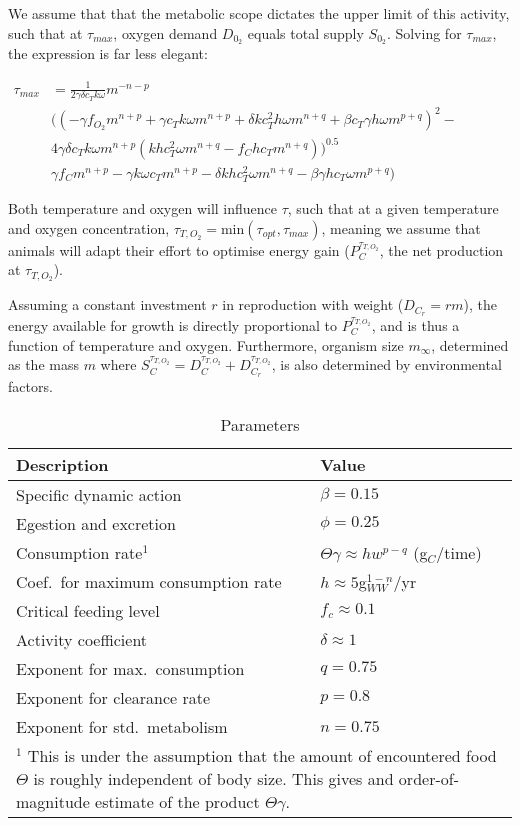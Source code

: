 \documentclass{article}
\begin{document}
We assume that that the metabolic scope dictates the upper limit of this activity, such that at $\tau_{max}$, oxygen demand $D_{0_2}$ equals total supply $S_{0_2}$. Solving for $\tau_{max}$, the expression is far less elegant:

\begin{math}
     \begin{aligned}
\tau_{max} &= \frac{1}{2 \gamma \delta c_T k \omega} m^{-n-p} \\
           &((-\gamma f_{O_2} m^{n+p}+\gamma c_T k \omega m^{n+p}+\delta k c_T^2 h \omega m^{n+q}+\beta c_T \gamma h \omega m^{p+q})^2 - \\ 
           &4 \gamma \delta c_T k \omega m^{n+p} (k h c_T^2 \omega m^{n+q}-f_C h c_T m^{n+q}))^{0.5} \\
          &\gamma f_C m^{n+p}-\gamma k \omega c_T m^{n+p}-\delta k h c_T^2 \omega m^{n+q}-\beta \gamma h c_T \omega m^{p+q})
          \end{aligned}
\end{math}

Both temperature and oxygen will influence $\tau$, such that at a given temperature and oxygen concentration, $\tau_{T,O_2} = \text{min}\left( \tau_{opt},\tau_{max} \right)$, meaning we assume that animals will adapt their effort to optimise energy gain ($P_C^{\tau_{T,O_2}}$, the net production at $\tau_{T,O_2}$).

Assuming a constant investment $r$ in reproduction with weight ($D_{C_r}=rm$), the energy available for growth is directly proportional to $P_C^{\tau_{T,O_2}}$, and is thus a function of temperature and oxygen. Furthermore, organism size $m_{\infty}$, determined as the mass $m$ where $S_C^{\tau_{T,O_2}} = D_C^{\tau_{T,O_2}} + D_{C_r}^{\tau_{T,O_2}}$, is also determined by environmental factors.


\begin{table}
\caption{Parameters}
\begin{tabular}{ll}
Description & Value \\
\hline
Specific dynamic action & $\beta = 0.15$ \\
Egestion and excretion & $\phi = 0.25$ \\
Consumption rate$^1$ & $\Theta \gamma \approx h w^{p-q}$ (g$_C$/time) \\
Coef.~for maximum consumption rate & $h \approx 5 $g$_{WW}^{1-n}$/yr \\
Critical feeding level & $f_c \approx 0.1 $\\
Activity coefficient & $\delta \approx 1$ \\
Exponent for max.~consumption & $q=0.75$ \\
Exponent for clearance rate & $p=0.8$ \\
Exponent for std.~metabolism & $n=0.75$ \\
\hline
\multicolumn{2}{p{\textwidth}}{$^1$ This is under the assumption that the amount of encountered food $\Theta$ is roughly independent of body size.  This gives and order-of-magnitude estimate of the product $\Theta \gamma $.}
\end{tabular}
\end{table}
\end{document}
